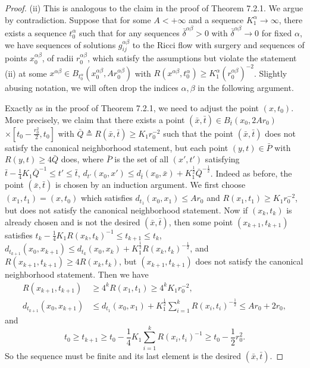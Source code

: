 \begin{proof}
\medskip
(ii) This is analogous to the claim in the proof of Theorem 7.2.1.
We argue by contradiction. Suppose that for some $A<+\infty$ and a
sequence $K^{\alpha}_1\rightarrow\infty$, there exists a sequence
$t^{\alpha}_0$ such that for any sequences
$\bar{\delta}^{\alpha\beta}>0$ with
$\bar{\delta}^{\alpha\beta}\rightarrow0$ for fixed $\alpha$, we
have sequences of solutions $g^{\alpha\beta}_{ij}$ to the Ricci
flow with surgery and sequences of points $x^{\alpha\beta}_0$, of
radii $r^{\alpha\beta}_0$, which satisfy the assumptions but
violate the statement (ii) at some $x^{\alpha\beta}\in
B_{t^{\alpha}_0}(x^{\alpha\beta}_0,Ar^{\alpha\beta}_0)$ with
$R(x^{\alpha\beta},t^{\alpha}_0)\geq
K^{\alpha}_1(r^{\alpha\beta}_0)^{-2}$. Slightly abusing notation,
we will often drop the indices $\alpha,\beta$ in the following
argument.

Exactly as in the proof of Theorem 7.2.1, we need to adjust the
point $(x,t_0)$. More precisely, we claim that there exists a
point $(\bar{x},\bar{t})\!\in\! B_{\bar{t}}(x_0,2Ar_0)$
$\times[t_0-\frac{r^2_0}{2},t_0]$ with $\bar{Q}\triangleq
R(\bar{x},\bar{t})\geq K_1r^{-2}_0$ such that the point
$(\bar{x},\bar{t})$ does not satisfy the canonical neighborhood
statement, but each point $(y,t)\in \bar{P}$ with $R(y,t)\geq
4\bar{Q}$ does, where $\bar{P}$ is the set of all $(x',t')$
satisfying $\bar{t}-\frac{1}{4}K_1\bar{Q}^{-1}\leq t'\leq
\bar{t}$, $d_{t'}(x_0,x')\leq
d_{\bar{t}}(x_0,\bar{x})+K^{\frac{1}{2}}_1\bar{Q}^{-\frac{1}{2}}$.
Indeed as before, the point $(\bar{x},\bar{t})$ is chosen by an
induction argument. We first choose $(x_1,t_1)=(x,t_0)$ which
satisfies $d_{t_1}(x_0,x_1)\leq Ar_0$ and $R(x_1,t_1)\geq
K_1r^{-2}_0$, but does not satisfy the canonical neighborhood
statement. Now if $(x_k,t_k)$ is already chosen and is not the
desired $(\bar{x},\bar{t})$, then some point $(x_{k+1},t_{k+1})$
satisfies $t_k-\frac{1}{4}K_1R(x_k,t_k)^{-1}\leq t_{k+1}\leq t_k$,
$d_{t_{k+1}}(x_0,x_{k+1})\leq
d_{t_k}(x_0,x_k)+K^{\frac{1}{2}}_1R(x_k,t_k)^{-\frac{1}{2}}$, and
$R(x_{k+1},t_{k+1})\geq 4R(x_k,t_k)$, but $(x_{k+1},t_{k+1})$ does
not satisfy the canonical neighborhood statement. Then we have
\begin{align*}
R(x_{k+1},t_{k+1})&\geq 4^kR(x_1,t_1)\geq 4^kK_1r^{-2}_0,\\
d_{t_{k+1}}(x_0,x_{k+1}) &\leq d_{t_1}(x_0,x_1)+K^{\frac{1}{2}}_1
\sum^k_{i=1}R(x_i,t_i)^{-\frac{1}{2}} \leq Ar_0+2r_0,
\end{align*}
and
$$
t_0\geq t_{k+1}\geq
t_0-\frac{1}{4}K_1\sum^k_{i=1}R(x_i,t_i)^{-1}\geq
t_0-\frac{1}{2}r^2_0.
$$
So the sequence must be finite and its last element is the desired
$(\bar{x},\bar{t})$.


\end{proof}
